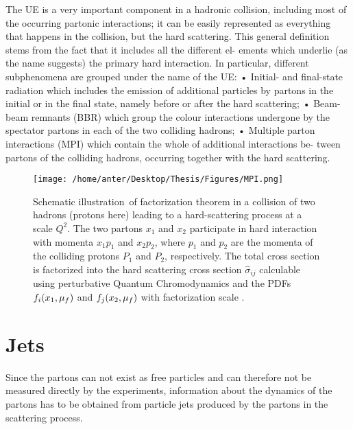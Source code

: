 The UE is a very important component in a hadronic collision, including most of the occurring
partonic interactions; it can be easily represented as everything that happens in the collision, but
the hard scattering. This general definition stems from the fact that it includes all the different el-
ements which underlie (as the name suggests) the primary hard interaction. In particular, different
subphenomena are grouped under the name of the UE:
• Initial- and final-state radiation which includes the emission of additional particles by partons
in the initial or in the final state, namely before or after the hard scattering;
• Beam-beam remnants (BBR) which group the colour interactions undergone by the spectator
partons in each of the two colliding hadrons;
• Multiple parton interactions (MPI) which contain the whole of additional interactions be-
tween partons of the colliding hadrons, occurring together with the hard scattering.

\begin{figure}[!h]
\begin{center}
\hspace*{-7mm}
\texttt{[image: /home/anter/Desktop/Thesis/Figures/MPI.png]}\\
\vspace*{4mm}
\caption[Factorization]{Schematic illustration\footnotemark~of factorization theorem in a collision of two hadrons (protons here) leading to a hard-scattering process at a scale $Q^2$. The two partons $x_1$ and $x_2$ participate in hard interaction with momenta $x_1p_1$ and $x_2p_2$, where $p_1$ and $p_2$ are the momenta of the colliding protons $P_1$ and $P_2$, respectively. The total cross section is factorized into the hard scattering cross section $\hat\sigma_{ij}$ calculable using perturbative Quantum Chromodynamics and the PDFs $f_i(x_1,\mu_f)$ and $f_j(x_2,\mu_f)$ with factorization scale \muf.}
\label{fig:MPI}
\end{center}
\end{figure}

\section{Jets}
\label{sec:jets}
Since the partons can not exist as free
particles and can therefore not be measured directly by the experiments, information about
the dynamics of the partons has to be obtained from particle jets produced by the partons
in the scattering process.

